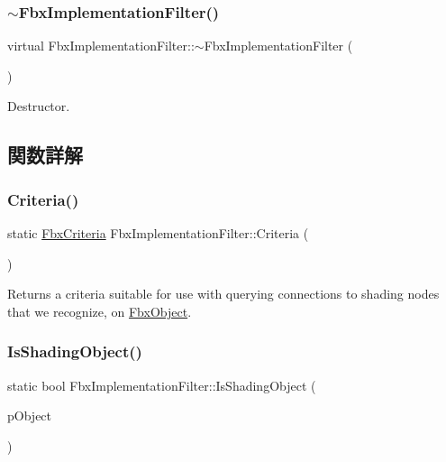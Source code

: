 \subsubsection{\texorpdfstring{$\sim$\+Fbx\+Implementation\+Filter()}{~FbxImplementationFilter()}}
{\footnotesize\ttfamily virtual Fbx\+Implementation\+Filter\+::$\sim$\+Fbx\+Implementation\+Filter (\begin{DoxyParamCaption}{ }\end{DoxyParamCaption})\hspace{0.3cm}{\ttfamily [virtual]}}



Destructor. 



\subsection{関数詳解}
\mbox{\label{class_fbx_implementation_filter_a343590c07f9897b9cf8ceed11b979491}} 
\subsubsection{\texorpdfstring{Criteria()}{Criteria()}}
{\footnotesize\ttfamily static \hyperlink{class_fbx_criteria}{Fbx\+Criteria} Fbx\+Implementation\+Filter\+::\+Criteria (\begin{DoxyParamCaption}{ }\end{DoxyParamCaption})\hspace{0.3cm}{\ttfamily [static]}}

Returns a criteria suitable for use with querying connections to shading nodes that we recognize, on \hyperlink{class_fbx_object}{Fbx\+Object}. \mbox{\label{class_fbx_implementation_filter_a3109594701842272e84f683f696d8e4b}} 
\subsubsection{\texorpdfstring{Is\+Shading\+Object()}{IsShadingObject()}}
{\footnotesize\ttfamily static bool Fbx\+Implementation\+Filter\+::\+Is\+Shading\+Object (\begin{DoxyParamCaption}\item[{const \hyperlink{class_fbx_object}{Fbx\+Object} $\ast$}]{p\+Object }\end{DoxyParamCaption})\hspace{0.3cm}{\ttfamily [static]}}

